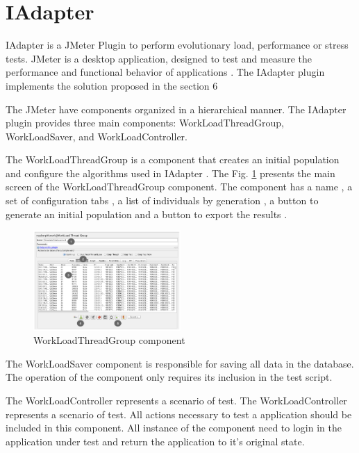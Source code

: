 \FloatBarrier
\section{IAdapter}

IAdapter is a JMeter Plugin to perform evolutionary load, performance or stress tests. JMeter is a desktop application, designed to test and measure the performance and functional behavior of applications \cite{Nevedrov2007}. The IAdapter plugin implements the solution proposed in the section 6

The JMeter have components organized  in a hierarchical manner. The IAdapter plugin provides three main components: WorkLoadThreadGroup, WorkLoadSaver, and WorkLoadController.
 
The WorkLoadThreadGroup is a component that creates an initial population and configure the algorithms used in IAdapter . The Fig. \ref{fig:tela1iadapter} presents the main screen of the WorkLoadThreadGroup component. The component has a name , a set of configuration tabs , a list of individuals by generation , a button to generate an initial population  and a button to export the results .

\begin{figure}[h]
\includegraphics[width=0.5\textwidth]{./images/tela1iadapter.png}
\caption{WorkLoadThreadGroup component}
\label{fig:tela1iadapter}
\end{figure}

The WorkLoadSaver component is responsible for saving all data in the database. The operation of the component only requires its inclusion in the test script.

The WorkLoadController represents a scenario of test. The WorkLoadController represents a scenario of test. All actions necessary to test a application should be included in this component. All instance of the component need to login in the application under test and return the application to it's original state.

